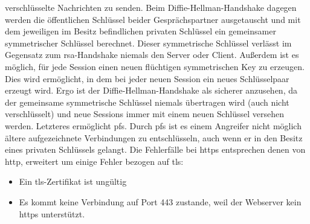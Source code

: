 \documentclass[titlepage]{report}
\begin{document}
verschlüsselte Nachrichten zu senden. Beim
Diffie\hyp{}Hellman\hyp{}Handshake dagegen werden die öffentlichen
Schlüssel beider Gesprächspartner ausgetauscht und mit dem jeweiligen im
Besitz befindlichen privaten Schlüssel ein gemeinsamer symmetrischer
Schlüssel berechnet. Dieser symmetrische Schlüssel verlässt im Gegensatz
zum \gls{rsa}\hyp{}Handshake niemals den Server oder Client. Außerdem
ist es möglich, für jede Session einen neuen flüchtigen symmetrischen Key
zu erzeugen. Dies wird ermöglicht, in dem bei jeder neuen Session ein
neues Schlüsselpaar erzeugt wird. Ergo ist der
Diffie\hyp{}Hellman\hyp{}Handshake als sicherer anzusehen, da der
gemeinsame symmetrische Schlüssel niemals übertragen wird (auch nicht
verschlüsselt) und neue Sessions immer mit einem neuen Schlüssel
versehen werden. Letzteres ermöglicht \gls{pfs}. Durch \gls{pfs} ist es
einem Angreifer nicht möglich ältere aufgezeichnete Verbindungen zu
entschlüsseln, auch wenn er in den Besitz eines privaten Schlüssels
gelangt.
Die Fehlerfälle bei \gls{https} entsprechen denen von \gls{http}, 
erweitert um einige Fehler bezogen auf \gls{tls}:
\begin{itemize}
    \item Ein \gls{tls}\hyp{}Zertifikat ist ungültig
    \item Es kommt keine Verbindung auf Port 443 zustande, weil der
          Webserver kein \gls{https} unterstützt.
\end{itemize}
\end{document}

